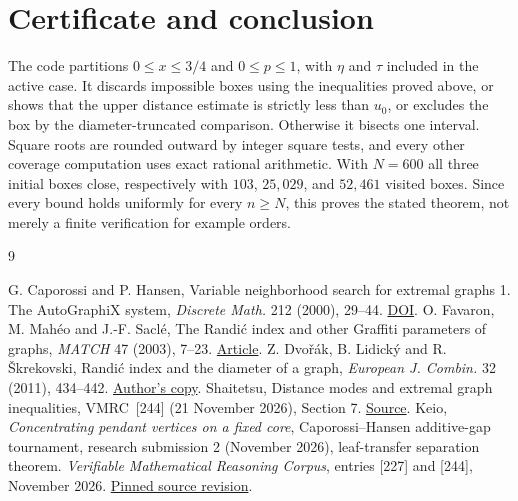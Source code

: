 \section{Certificate and conclusion}
The code partitions $0\le x\le3/4$ and $0\le p\le1$, with $\eta$ and $\tau$ included in the active case. It discards impossible boxes using the inequalities proved above, or shows that the upper distance estimate is strictly less than $u_0$, or excludes the box by the diameter-truncated comparison. Otherwise it bisects one interval. Square roots are rounded outward by integer square tests, and every other coverage computation uses exact rational arithmetic. With $N=600$ all three initial boxes close, respectively with $103$, $25{,}029$, and $52{,}461$ visited boxes. Since every bound holds uniformly for every $n\ge N$, this proves the stated theorem, not merely a finite verification for example orders.

\begin{thebibliography}{9}

 G. Caporossi and P. Hansen, Variable neighborhood search
for extremal graphs 1. The AutoGraphiX system, \emph{Discrete Math.}
212 (2000), 29--44. \href{https://doi.org/10.1016/S0012-365X(99)00206-X}{DOI}.
 O. Favaron, M. Mah\'eo and J.-F. Sacl\'e, The Randi\'c index
and other Graffiti parameters of graphs, \emph{MATCH} 47 (2003), 7--23.
\href{https://match.pmf.kg.ac.rs/electronic_versions/Match47/match47_7-23.pdf}{Article}.
 Z. Dvo\v{r}\'ak, B. Lidick\'y and R. \v{S}krekovski,
Randi\'c index and the diameter of a graph, \emph{European J. Combin.}
32 (2011), 434--442.
\href{https://kam.mff.cuni.cz/~bernard/pub/index.pdf}{Author's copy}.
 Shaitetsu, Distance modes and extremal graph
inequalities, VMRC~[244] (21 November 2026), Section 7.
\href{https://github.com/QEEDDD/Verifiable-Mathematical-Reasoning-Corpus/blob/52c1e4ae1f82bd3fdc8b809b9a94e2e4c6ef4cb3/\%5B244\%5D\%20Graph_Distance_Modes_and_Extrema.tex}{Source}.
 Keio, \emph{Concentrating pendant vertices on a fixed core}, Caporossi--Hansen additive-gap tournament, research submission 2 (November 2026), leaf-transfer separation theorem.
 \emph{Verifiable Mathematical Reasoning Corpus}, entries [227] and [244], November 2026. \href{https://github.com/QEEDDD/Verifiable-Mathematical-Reasoning-Corpus/tree/52c1e4ae1f82bd3fdc8b809b9a94e2e4c6ef4cb3}{Pinned source revision}.
\end{thebibliography}
\clearpage
\appendix
